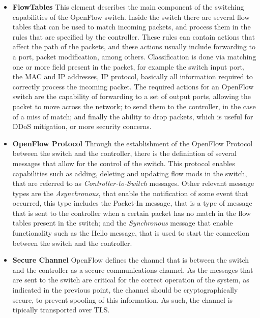 \begin {enumerate}
\begin {itemize}
    \item \textbf {FlowTables} This element describes the main component of the switching capabilities of the OpenFlow switch. Inside the switch there are several flow tables that can be used to match incoming packets,
and process them in the rules that are specified by the controller. These rules can contain actions that affect the path of the packets, and these actions usually include forwarding to a port, packet modification, among
others. Classification is done via matching one or more field present in the packet, for example the switch input port, the MAC and IP addresses, IP protocol, basically all information required to correctly process the 
incoming packet. The required actions for an OpenFlow switch are the capability of forwarding to a set of output ports, allowing the packet to move across the network; to send them to the controller, in the case of a
miss of match; and finally the ability to drop packets, which is useful for DDoS mitigation, or more security concerns.
    \item \textbf {OpenFlow Protocol} Through the establishment of the OpenFlow Protocol between the switch and the controller, there is the definintion of several messages that allow for the control of the switch. This protocol
enables capabilities such as adding, deleting and updating flow mods in the switch, that are referred to as \textit {Controller-to-Switch} messages. Other relevant message types are the \textit {Asynchronous}, that enable the
notification of some event that occurred, this type includes the Packet-In message, that is a type of message that is sent to the controller when a certain packet has no match in the flow tables present in the switch; and the 
\textit{ Synchronous} message that enable functionality such as the Hello message, that is used to start the connection between the switch and the controller.
    \item \textbf {Secure Channel} OpenFlow defines the channel that is between the switch and the controller as a secure communications channel. As the messages that are sent to the switch are critical for the correct operation 
of the system, as indicated in the previous point, the channel should be cryptographically secure, to prevent spoofing of this information. As such, the channel is tipically transported over TLS.
\end {itemize}


\end{enumerate}
